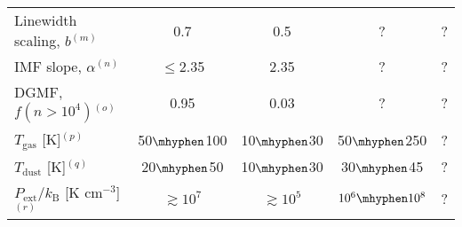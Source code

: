 \begin{table*}[ht]
\begin{tabular}{lcccc}
Linewidth scaling, $b$$^{(m)}$                      & 0.7                           & 0.5                 & ?                  &  ? \\
IMF slope, $\alpha$$^{(n)}$                         & $\leq$2.35                    & 2.35                & ?                  &  ? \\
DGMF, $f(n>10^4)$$^{(o)}$                           & 0.95                          & 0.03                & ?                  &  ? \\
$T_\mathrm{gas}$ [K]$^{(p)}$                        & 50$\mhyphen$100               & 10$\mhyphen$30      & 50$\mhyphen$250    & ? \\
$T_\mathrm{dust}$ [K]$^{(q)}$                       & 20$\mhyphen$50                & 10$\mhyphen$30      & 30$\mhyphen$45     & ? \\
$P_\mathrm{ext}/k_\mathrm{B}$ [K cm$^{-3}$]$^{(r)}$ & $\gtrsim10^7$                 & $\gtrsim10^5$       & $10^6\mhyphen10^8$  & ? \\ \hline
    \end{tabular}
    

\end{table*}
